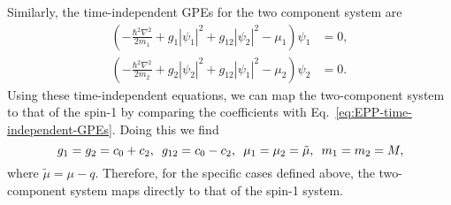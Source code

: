 Similarly, the time-independent GPEs for the two component system are
\begin{equation}
    \begin{aligned}
        \left(-\frac{\hbar^2\nabla^2}{2m_1} + g_1|\psi_1|^2
        +g_{12}|\psi_2|^2 - \mu_1\right)\psi_1 &= 0, \\
        \left(-\frac{\hbar^2\nabla^2}{2m_2} + g_2|\psi_2|^2
        +g_{12}|\psi_1|^2 - \mu_2\right)\psi_2 &= 0.
    \end{aligned}
    \label{eq:two-comp-time-independent-gpes}
\end{equation}
Using these time-independent equations, we can map the two-component system
to that of the spin-1 by comparing the coefficients with
Eq.~\eqref{eq:EPP-time-independent-GPEs}.
Doing this we find
\begin{equation}
    g_1=g_2=c_0+c_2, \enskip g_{12} = c_0-c_2, \enskip \mu_1=\mu_2=\tilde{\mu}, 
    \enskip m_1=m_2=M,
\end{equation}
where $\tilde{\mu} = \mu - q$.
Therefore, for the specific cases defined above, the two-component system maps
directly to that of the spin-1 system.

